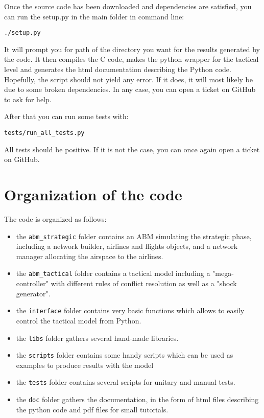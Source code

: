 \documentclass[12pt]{article}
\begin{document}
Once the source code has been downloaded and dependencies are satisfied, you can run the setup.py in the main folder in command line:

\begin{verbatim}
./setup.py
\end{verbatim}

It will prompt you for path of the directory you want for the results generated by the code. It then compiles the C code, makes the python wrapper for the tactical level and generates the html documentation describing the Python code. Hopefully, the script should not yield any error. If it does, it will most likely be due to some broken dependencies. In any case, you can open a ticket on GitHub to ask for help. 

After that you can run some tests with:
\begin{verbatim}
tests/run_all_tests.py
\end{verbatim}

All tests should be positive. If it is not the case, you can once again open a ticket on GitHub.

\section{Organization of the code}

The code is organized as follows:
\begin{itemize}
\item the \verb|abm_strategic| folder contains an ABM simulating the strategic phase, including a network builder, airlines and flights objects, and a network manager allocating the airspace to the airlines. 
\item the \verb|abm_tactical| folder contains a tactical model including a "mega-controller" with different rules of conflict resolution as well as a "shock generator".
\item the \verb|interface| folder contains very basic functions which allows to easily control the tactical model from Python.
\item the \verb|libs| folder gathers several hand-made libraries.
\item the \verb|scripts| folder contains some handy scripts which can be used as examples to produce results with the model
\item the \verb|tests| folder contains several scripts for unitary and manual tests. 
\item the \verb|doc| folder gathers the documentation, in the form of html files describing the python code and pdf files for small tutorials.
\end{itemize}          
\end{document}
